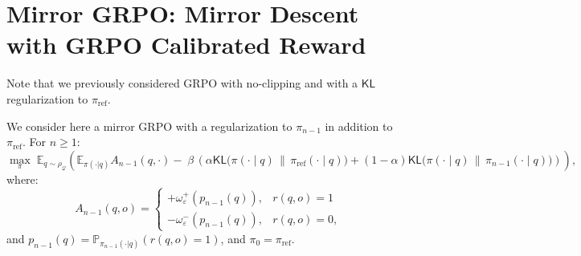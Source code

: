 \documentclass[11pt,reqno]{amsart}
\makeatletter
\providecommand\paragraph{\@startsection{paragraph}{4}{\z@}%
  {3.25ex \@plus1ex \@minus.2ex}{-1em}%
  {\normalfont\normalsize\bfseries}}
\makeatother
\begin{document}
\section{Mirror GRPO: Mirror Descent with GRPO Calibrated Reward}\label{Sec:MirrorGRPO}

\label{sec:mirror-only}

Note that we previously considered GRPO with no-clipping and with a $\mathsf{KL}$ regularization to $
\pi_{\mathrm{ref}}$.


We consider here a mirror GRPO with a regularization to $\pi_{n-1}$ in addition to $\pi_{\mathrm{ref}}$. For $n\geq 1$:
\begin{equation}
\label{eq:mirror-obj1}
\max_{\pi}\; \mathbb{E}_{q\sim \rho_{\mathcal{Q}}} \left(\mathbb{E}_{\pi(\cdot|q)}
A_{n-1}(q,\cdot)-\;\beta\, \left( \alpha \mathsf{KL}\!\Big(\pi(\cdot\mid q)\,\Big\|\,\pi_{\mathrm{ref}}(\cdot\mid q)\Big)+ (1-\alpha ) \mathsf{KL}\!\Big(\pi(\cdot\mid q)\,\Big\|\,\pi_{n-1}(\cdot\mid q)\Big)\right) \right),
\end{equation}
where:
\begin{equation}
\label{eq:group-const-adv}
A_{n-1}(q,o)=
\begin{cases}
+\omega^+_\varepsilon(p_{n-1}(q)), & r(q,o)=1\\[2pt]
-\omega^-_\varepsilon(p_{n-1}(q)), &r(q,o)=0,
\end{cases}
\end{equation}
and $p_{n-1}(q)=\mathbb{P}_{\pi_{n-1}(\cdot|q)}(r(q,o)=1)$, and $\pi_0=\pi_{\mathrm{ref}}$.
\end{document}
